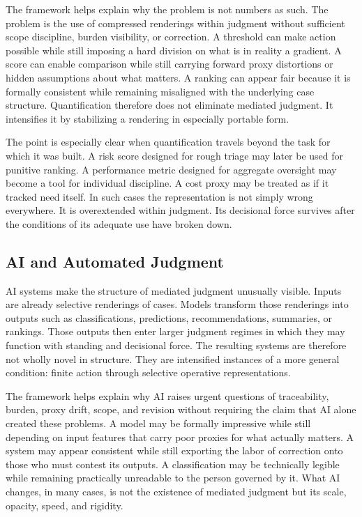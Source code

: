 \documentclass[11pt]{article}
\begin{document}
The framework helps explain why the problem is not numbers as such. The problem is the use of compressed renderings within judgment without sufficient scope discipline, burden visibility, or correction. A threshold can make action possible while still imposing a hard division on what is in reality a gradient. A score can enable comparison while still carrying forward proxy distortions or hidden assumptions about what matters. A ranking can appear fair because it is formally consistent while remaining misaligned with the underlying case structure. Quantification therefore does not eliminate mediated judgment. It intensifies it by stabilizing a rendering in especially portable form.\cite{BowkerStar1999SortingThingsOut,ONeil2016WeaponsMathDestruction,Obermeyer2019DissectingRacialBias}

The point is especially clear when quantification travels beyond the task for which it was built. A risk score designed for rough triage may later be used for punitive ranking. A performance metric designed for aggregate oversight may become a tool for individual discipline. A cost proxy may be treated as if it tracked need itself. In such cases the representation is not simply wrong everywhere. It is overextended within judgment. Its decisional force survives after the conditions of its adequate use have broken down.

\subsection{AI and Automated Judgment}

AI systems make the structure of mediated judgment unusually visible. Inputs are already selective renderings of cases. Models transform those renderings into outputs such as classifications, predictions, recommendations, summaries, or rankings. Those outputs then enter larger judgment regimes in which they may function with standing and decisional force. The resulting systems are therefore not wholly novel in structure. They are intensified instances of a more general condition: finite action through selective operative representations.

The framework helps explain why AI raises urgent questions of traceability, burden, proxy drift, scope, and revision without requiring the claim that AI alone created these problems. A model may be formally impressive while still depending on input features that carry poor proxies for what actually matters. A system may appear consistent while still exporting the labor of correction onto those who must contest its outputs. A classification may be technically legible while remaining practically unreadable to the person governed by it. What AI changes, in many cases, is not the existence of mediated judgment but its scale, opacity, speed, and rigidity.\cite{ONeil2016WeaponsMathDestruction,Eubanks2018AutomatingInequality,Obermeyer2019DissectingRacialBias}
\end{document}
